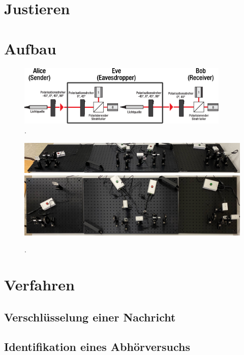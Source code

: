 \newpage
\section{Justieren}

\section{Aufbau}

\begin{figure}[H]
	\centering
	\includegraphics[width=0.9\textwidth]{content/aufbau/schema.pdf}
	\caption{. \cite{krypt}}
	\label{fig:schema}
\end{figure}

\begin{figure}[H]
	\centering
	\includegraphics[width=1.0\textwidth]{content/aufbau/front.jpg}\\[1ex]
	\includegraphics[width=1.0\textwidth]{content/aufbau/drauf.jpg}
	\caption{.}
	\label{fig:aufbau}
\end{figure}

\section{Verfahren}

\subsection{Verschlüsselung einer Nachricht}

\subsection{Identifikation eines Abhörversuchs}
